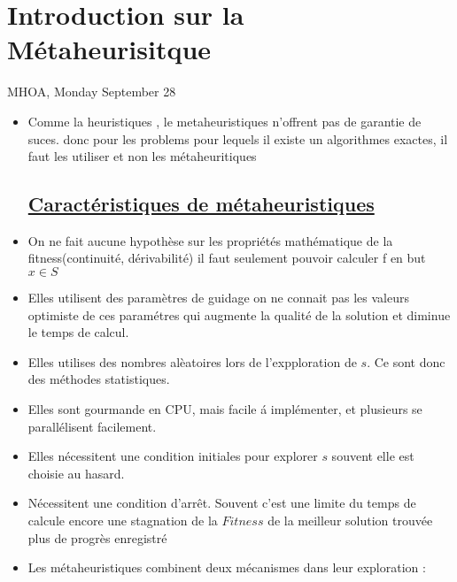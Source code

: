 \chapter{Introduction sur la M\'etaheurisitque}
\centerline{MHOA, Monday September 28} %
\begin{itemize}
\section{\underline{$S$ Espace de recherche} }

\item  Comme la heuristiques , le metaheuristiques n'offrent pas de garantie de suces.
donc pour les problems pour lequels il existe un algorithmes exactes, il faut les utiliser et non les m\'etaheuritiques

\section{\underline{Caract\'eristiques de m\'etaheuristiques}}

\item On ne fait aucune hypothèse sur les propriétés mathématique de la fitness(continuité, dérivabilité)
il faut seulement pouvoir calculer f en but $ x \in S$

\item Elles utilisent des param\`etres de guidage on ne connait pas les valeurs optimiste de ces param\'etres qui augmente la qualit\'e de la solution et diminue le temps de calcul.

\item Elles utilises des nombres al\`eatoires lors de l'expploration de $s$.
Ce sont donc des m\'ethodes statistiques.

\item Elles sont gourmande en CPU, mais facile \'a impl\'ementer, et plusieurs se parall\'elisent facilement.

\item Elles n\'ecessitent une condition initiales pour explorer $s$ souvent elle est choisie au hasard.
\item N\'ecessitent une condition d'arr\^et.
Souvent c'est une limite du temps de calcule  encore une stagnation de la $Fitness$ de la meilleur solution trouv\'ee plus de progr\`es enregistr\'e
\item Les m\'etaheuristiques combinent deux m\'ecanismes dans leur exploration :
\begin{enumerate}


\end{enumerate}
\end{itemize}
